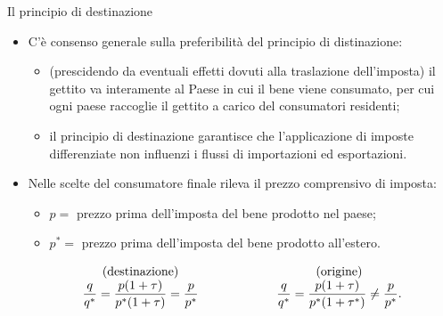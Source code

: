 \documentclass[aspectratio=64,11pt]{beamer}
\begin{document}
\begin{frame}{Il principio di destinazione}
  \begin{itemize}
  \item C'è consenso generale sulla preferibilità del principio di distinazione:
  \begin{itemize}
  \item (prescidendo da eventuali effetti dovuti alla traslazione
    dell'imposta) il gettito va interamente al Paese in cui il bene viene
    consumato, per cui ogni paese raccoglie il gettito a carico del
    consumatori residenti;
  \item il principio di destinazione garantisce che l'applicazione di imposte
    differenziate non influenzi i flussi di importazioni ed esportazioni.
  \end{itemize}
\item Nelle scelte del consumatore finale rileva il prezzo comprensivo di
  imposta:
  \begin{itemize}
  \item \(p =\) prezzo prima dell'imposta del bene prodotto nel paese;
  \item \(p^* =\) prezzo prima dell'imposta del bene prodotto all'estero.
  \end{itemize}
  \begin{equation*}
\begin{array}{cp{1.5cm}c}
   \text{(destinazione)} &&  \text{(origine)} \\
   \dfrac{q}{q^*}=\dfrac{p(1+\tau)}{p^*(1+\tau)}=\dfrac{p}{p^*} &&
   \dfrac{q}{q^*}=\dfrac{p(1+\tau)}{p^*(1+\tau^*)}\not= \dfrac{p}{p^*}.
\end{array}
\end{equation*}
\end{itemize}
\end{frame}
\end{document}
